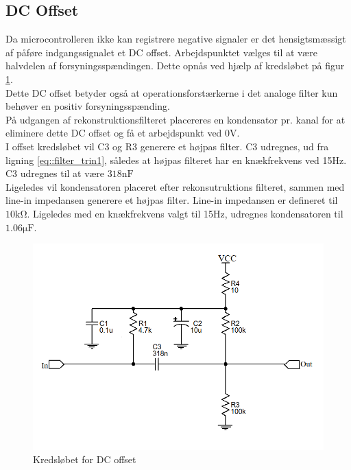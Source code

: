\subsection{DC Offset}
Da microcontrolleren ikke kan registrere negative signaler er det hensigtsmæssigt af påføre indgangssignalet et DC offset. Arbejdspunktet vælges til at være halvdelen af forsyningsspændingen. Dette opnås ved hjælp af kredsløbet på figur \ref{fig::anfilter_off}. \\
Dette DC offset betyder også at operationsforstærkerne i det analoge filter kun behøver en positiv forsyningsspænding. \\
På udgangen af rekonstruktionsfilteret placereres en kondensator pr. kanal for at eliminere dette DC offset og få et arbejdspunkt ved 0V.\\
I offset kredsløbet vil C3 og R3 generere et højpas filter. C3 udregnes, ud fra ligning \ref{eq::filter_trin1}, således at højpas filteret har en knækfrekvens ved 15Hz. C3 udregnes til at være $318\si{\nano\farad}$\\
Ligeledes vil kondensatoren placeret efter rekonsutruktions filteret, sammen med line-in impedansen generere et højpas filter. Line-in impedansen er defineret til $10\si{\kilo\ohm}$. Ligeledes med en knækfrekvens valgt til 15Hz, udregnes kondensatoren til $1.06\si{\micro\farad}$.

\begin{figure}[h!]
	\centering
	\includegraphics[scale = 0.4]{./billeder/offset.png}
	\caption{Kredsløbet for DC offset}
	\label{fig::anfilter_off}
\end{figure}







